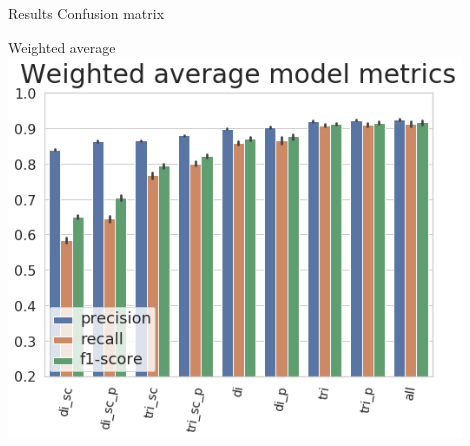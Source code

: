 \documentclass{beamer}
\begin{document}
\begin{frame}{Results Confusion matrix}
\end{frame}

\begin{frame}{Weighted average}
\includegraphics[width=0.90\textwidth]{avg_score_master}
\end{frame}
\end{document}
